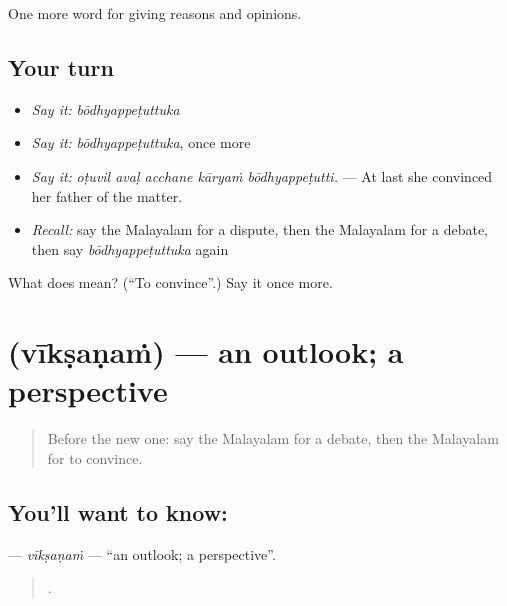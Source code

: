 \begin{grammarlens}[title={What you've built}]
One more word for giving reasons and opinions.
\end{grammarlens}

\subsection*{Your turn}
\begin{itemize}
\raggedright
  \item \emph{Say it:} \emph{bōdhyappeṭuttuka}
  \item \emph{Say it:} \emph{bōdhyappeṭuttuka}, once more
  \item \emph{Say it:} \emph{oṭuvil avaḷ acchane kāryaṁ bōdhyappeṭutti.} — At last she convinced her father of the matter.
  \item \emph{Recall:} say the Malayalam for a dispute, then the Malayalam for a debate, then say \emph{bōdhyappeṭuttuka} again
\end{itemize}

\begin{tcolorbox}[breakable,colback=teal!4,colframe=teal!35!black,title={Before you move on}]
What does  mean? (\textquotedblleft{}To convince\textquotedblright{}.) Say it once more.
\end{tcolorbox}
\section[\texorpdfstring{\ml{വീക്ഷണം} (vīkṣaṇaṁ)}{വീക്ഷണം (vīkṣaṇaṁ)}]{ (vīkṣaṇaṁ) — an outlook; a perspective}

\label{lesson:ML-C406-viksanam}



\begin{quote}
Before the new one: say the Malayalam for a debate, then the Malayalam for to convince.
\end{quote}

\subsection*{You'll want to know: }
\textbf{} — \emph{vīkṣaṇaṁ} — \textquotedblleft{}an outlook; a perspective\textquotedblright{}.

\begin{quote}
   .
\end{quote}


